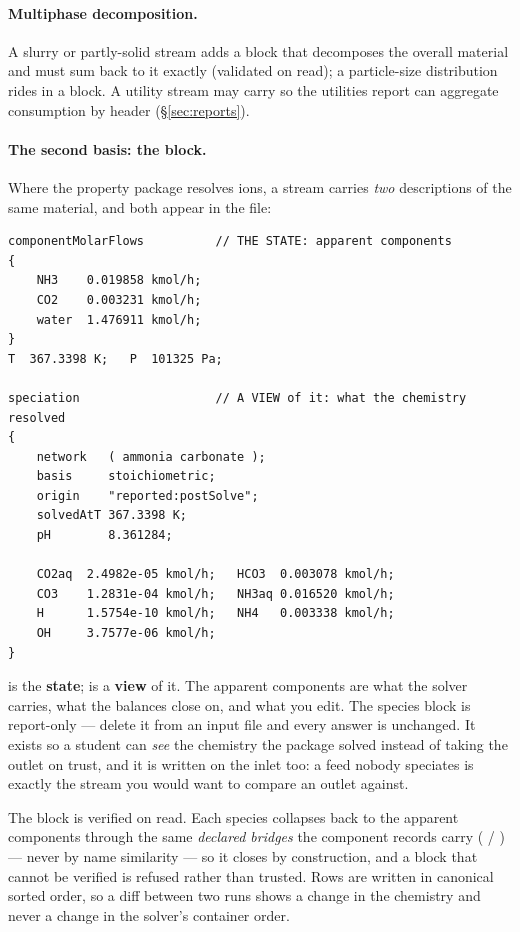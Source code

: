 \documentclass[11pt,a4paper]{article}
\begin{document}
\paragraph{Multiphase decomposition.}  A slurry or partly-solid stream
adds a  block that decomposes the overall material and
must sum back to it exactly (validated on read); a particle-size
distribution rides in a  block.  A utility stream may
carry  so the utilities report can aggregate
consumption by header (\S\ref{sec:reports}).

\paragraph{The second basis: the  block.}
Where the property package resolves ions, a stream carries \emph{two}
descriptions of the same material, and both appear in the file:

\begin{lstlisting}
componentMolarFlows          // THE STATE: apparent components
{
    NH3    0.019858 kmol/h;
    CO2    0.003231 kmol/h;
    water  1.476911 kmol/h;
}
T  367.3398 K;   P  101325 Pa;

speciation                   // A VIEW of it: what the chemistry resolved
{
    network   ( ammonia carbonate );
    basis     stoichiometric;
    origin    "reported:postSolve";
    solvedAtT 367.3398 K;
    pH        8.361284;

    CO2aq  2.4982e-05 kmol/h;   HCO3  0.003078 kmol/h;
    CO3    1.2831e-04 kmol/h;   NH3aq 0.016520 kmol/h;
    H      1.5754e-10 kmol/h;   NH4   0.003338 kmol/h;
    OH     3.7577e-06 kmol/h;
}
\end{lstlisting}

\begin{keyidea}
 is the \textbf{state};  is a
\textbf{view} of it.  The apparent components are what the solver carries,
what the balances close on, and what you edit.  The species block is
report-only --- delete it from an input file and every answer is
unchanged.  It exists so a student can \emph{see} the chemistry the
package solved instead of taking the outlet on trust, and it is written on
the inlet too: a feed nobody speciates is exactly the stream you would
want to compare an outlet against.
\end{keyidea}

The block is verified on read.  Each species collapses back to the
apparent components through the same \emph{declared bridges} the component
records carry ( / ) --- never by
name similarity --- so it closes by construction, and a block that cannot
be verified is refused rather than trusted.  Rows are written in canonical
sorted order, so a diff between two runs shows a change in the chemistry
and never a change in the solver's container order.
\end{document}
